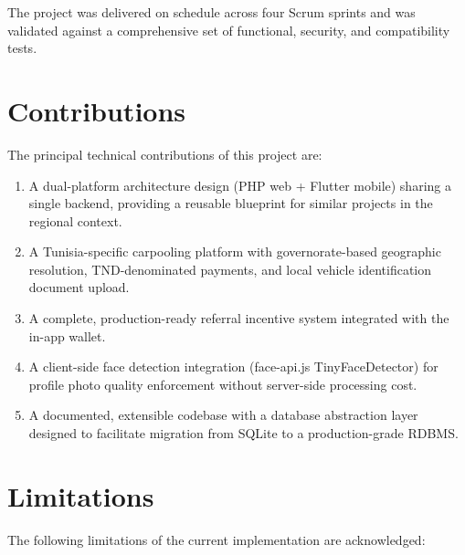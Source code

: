 \documentclass[12pt,a4paper,openright]{report}
\begin{document}
The project was delivered on schedule across four Scrum sprints and was validated against a comprehensive set of functional, security, and compatibility tests.

\section{Contributions}

The principal technical contributions of this project are:

\begin{enumerate}[noitemsep]
    \item A dual-platform architecture design (PHP web + Flutter mobile) sharing a single backend, providing a reusable blueprint for similar projects in the regional context.
    \item A Tunisia-specific carpooling platform with governorate-based geographic resolution, TND-denominated payments, and local vehicle identification document upload.
    \item A complete, production-ready referral incentive system integrated with the in-app wallet.
    \item A client-side face detection integration (face-api.js TinyFaceDetector) for profile photo quality enforcement without server-side processing cost.
    \item A documented, extensible codebase with a database abstraction layer designed to facilitate migration from SQLite to a production-grade RDBMS.
\end{enumerate}

\section{Limitations}

The following limitations of the current implementation are acknowledged:
\end{document}
